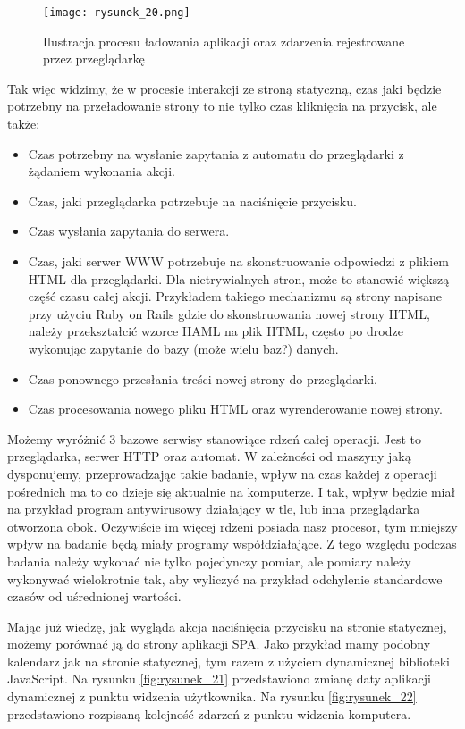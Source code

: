 \begin{figure}[htbp]
    \centering
    \texttt{[image: rysunek\_20.png]}
    \caption{Ilustracja procesu ładowania aplikacji oraz zdarzenia rejestrowane przez przeglądarkę}
    \label{fig:rysunek_20}
\end{figure}

Tak więc widzimy, że w procesie interakcji ze stroną statyczną, czas jaki będzie potrzebny na przeładowanie strony to nie tylko czas kliknięcia na przycisk, ale także:
\begin{itemize}
    \item Czas potrzebny na wysłanie zapytania z automatu do przeglądarki z żądaniem wykonania akcji.
    \item Czas, jaki przeglądarka potrzebuje na naciśnięcie przycisku.
    \item Czas wysłania zapytania do serwera.
    \item Czas, jaki serwer WWW potrzebuje na skonstruowanie odpowiedzi z plikiem HTML dla przeglądarki. Dla nietrywialnych stron, może to stanowić większą część czasu całej akcji.
    Przykładem takiego mechanizmu są strony napisane przy użyciu Ruby on Rails gdzie do skonstruowania nowej strony HTML,
    należy przekształcić wzorce HAML \cite{ruby} na plik HTML, często po drodze wykonując zapytanie do bazy (może wielu baz?) danych.
    \item Czas ponownego przesłania treści nowej strony do przeglądarki.
    \item Czas procesowania nowego pliku HTML oraz wyrenderowanie nowej strony.    
\end{itemize}

Możemy wyróżnić 3 bazowe serwisy stanowiące rdzeń całej operacji.
Jest to przeglądarka, serwer HTTP oraz automat.
W zależności od maszyny jaką dysponujemy, przeprowadzając takie badanie, wpływ na czas każdej z operacji pośrednich ma to co dzieje się aktualnie na komputerze.
I tak, wpływ będzie miał na przykład program antywirusowy działający w tle, lub inna przeglądarka otworzona obok.
Oczywiście im więcej rdzeni \cite{threads} posiada nasz procesor, tym mniejszy wpływ na badanie będą miały programy współdziałające.
Z tego względu podczas badania należy wykonać nie tylko pojedynczy pomiar, ale pomiary należy wykonywać wielokrotnie tak, aby wyliczyć na przykład
odchylenie standardowe czasów od uśrednionej wartości.

Mając już wiedzę, jak wygląda akcja naciśnięcia przycisku na stronie statycznej, możemy porównać ją do strony aplikacji SPA.
Jako przykład mamy podobny kalendarz jak na stronie statycznej, tym razem z użyciem dynamicznej biblioteki JavaScript.
Na rysunku \ref{fig:rysunek_21} przedstawiono zmianę daty aplikacji dynamicznej z punktu widzenia użytkownika.
Na rysunku \ref{fig:rysunek_22} przedstawiono rozpisaną kolejność zdarzeń z punktu widzenia komputera.

